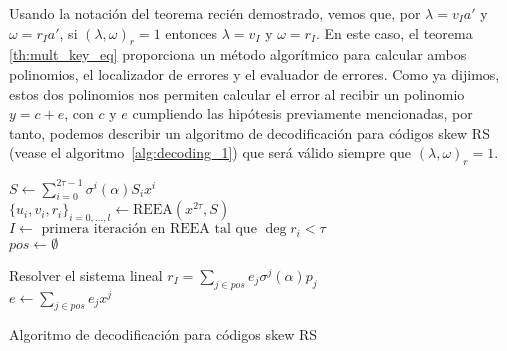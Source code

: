 Usando la notación del teorema recién demostrado, vemos que, por \(\lambda = v_{I}a'\) y \(\omega = r_{I}a'\), si \({{(\lambda, \omega)}_{r} = 1}\) entonces \(\lambda = v_{I}\) y \(\omega = r_{I}\). En este caso, el teorema \ref{th:mult_key_eq} proporciona un método algorítmico para calcular ambos polinomios, el localizador de errores y el evaluador de errores. Como ya dijimos, estos dos polinomios nos permiten calcular el error al recibir un polinomio \(y = c + e\), con \(c\) y \(e\) cumpliendo las hipótesis previamente mencionadas, por tanto, podemos describir un algoritmo de decodificación para códigos skew RS (vease el algoritmo~\ref{alg:decoding_1}) que será válido siempre que \({(\lambda, \omega)}_{r} = 1\).

\begin{algorithm}[h!]
 \label{alg:decoding_1}
 \(S \gets \sum_{i=0}^{2\tau -1} \sigma^{i}(\alpha)S_{i}x^{i}\)\\
 \({\{u_{i}, v_{i}, r_{i}\}}_{i=0,\ldots,l} \gets \text{REEA}(x^{2\tau}, S)\)\\
 \(I \gets \text{ primera iteración en REEA tal que } \deg r_{i} < \tau\)\\
 \(pos \gets \emptyset\)\\

Resolver el sistema lineal \(r_I = \sum_{j\in pos} e_{j}\sigma^{j}(\alpha)p_{j}\)\\
\(e \gets \sum_{j\in pos}e_{j}x^{j}\)\\
 \caption{Algoritmo de decodificación para códigos skew RS}
\end{algorithm}

